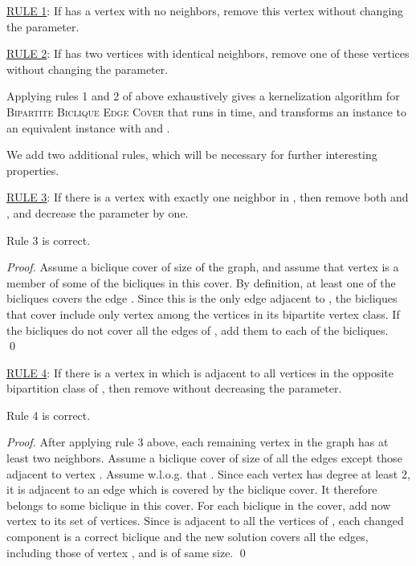 \noindent \underline{\textsf{RULE 1}}: If  has a vertex with
no neighbors, remove this vertex without changing the
parameter.

\noindent \underline{\textsf{RULE 2}}: If  has two vertices
with identical neighbors, remove one of these vertices without
changing the parameter.

\begin{lemma}
\label{Lemma: Kernel}Applying rules 1 and 2 of above exhaustively gives a
kernelization algorithm for \textsc{Bipartite Biclique Edge
Cover} that runs in  time, and transforms an instance
 to an equivalent instance  with  and .
\end{lemma}

We add two additional rules, which will be necessary
for further interesting properties.

\noindent \underline{\textsf{RULE 3}}: If there is a vertex 
with exactly one neighbor  in , then remove both  and
, and decrease the parameter by one.

\begin{lemma}\label{lemma: lrul3}
Rule 3 is correct.
\end{lemma}

\begin{proof}
Assume a biclique cover of size  of the graph, and assume
that vertex  is a member of some of the bicliques in this
cover. By definition, at least one of the bicliques covers the
edge 
. Since this is the only edge 
adjacent to , the bicliques that cover
 include only vertex  among the vertices in its
bipartite vertex class.
If the bicliques do not cover all the
edges of , add them to each of the bicliques. \qed
\end{proof}


\noindent \underline{\textsf{RULE 4}}: If there is a vertex 
in  which is adjacent to all vertices in the opposite
bipartition class of , then remove  without decreasing
the parameter.

\begin{lemma}\label{Lemma: lrul4}
Rule 4 is correct.
\end{lemma}

\begin{proof}
After applying rule 3 above, each remaining vertex in the graph
has at least two neighbors. Assume a biclique cover of size 
of all the edges except those adjacent to vertex .
Assume w.l.o.g. that . Since each vertex
 has degree at least 2, it is adjacent to an edge
which is covered by the biclique cover. It therefore belongs to
some biclique in this cover. For each biclique in the cover,
add now vertex  to its set of vertices. Since  is
adjacent to all the vertices of 
, each changed component is a correct biclique and the
new solution covers all the edges, including those of vertex
, and is of same size. \qed
\end{proof}


